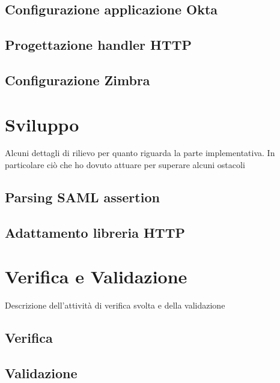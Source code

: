 \subsection{Configurazione applicazione Okta}
\subsection{Progettazione handler HTTP}
\subsection{Configurazione Zimbra}

\section{Sviluppo}
Alcuni dettagli di rilievo per quanto riguarda la parte implementativa. In particolare ciò che ho dovuto attuare per superare alcuni ostacoli
\subsection{Parsing SAML assertion}
\subsection{Adattamento libreria HTTP}

\section{Verifica e Validazione}
Descrizione dell'attività di verifica svolta e della validazione
\subsection{Verifica}
\subsection{Validazione}